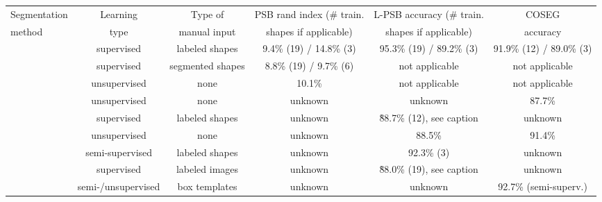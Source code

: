\begin{table*}[t!]
\small
  \centering
    \begin{tabular*}{\textwidth}{l|c|c|c|c|c@{}}
    \hline
    Segmentation                & Learning           & Type of          & PSB rand index (\# train. & L-PSB  accuracy (\# train.  & COSEG          \\
    method                      & type               & manual input     & shapes if applicable)     & shapes if applicable)       & accuracy       \\
    \hline
    \hline
    \cite{Kalogerakis:2010:LMS} & supervised         & labeled shapes   & 9.4\% (19) / 14.8\% (3)   & 95.3\% (19) / 89.2\% (3)    & 91.9\% (12) / 89.0\% (3) \\
    \hline
    \cite{Benhabiles:2011:LBE}  & supervised         & segmented shapes & 8.8\% (19) / 9.7\% (6)    & not applicable              & not applicable \\
    \hline
    \cite{Huang:2011:JSS}       & unsupervised       & none             & 10.1\%                    & not applicable              & not applicable \\
    \hline
    \cite{Sidi:2011:CS}         & unsupervised       & none             & unknown                   & unknown                     & 87.7\%         \\
    \hline
    \cite{van-Kaick:2011:PKC}   & supervised         & labeled shapes   & unknown                   & \~88.7\% (12), see caption   & unknown        \\
    \hline
    \cite{Hu:2012:CSS}          & unsupervised       & none             & unknown                   & 88.5\%                      & 91.4\%         \\
    \hline
    \cite{Lv:2012:SMS}          & semi-supervised    & labeled shapes   & unknown                   & 92.3\% (3)                  & unknown        \\
    \hline
    \cite{Wang:2013:PAS}        & supervised         & labeled images   & unknown                   & \~88.0\% (19), see caption   & unknown               \\
    \hline
    \cite{Kim:2013:lpt}         & semi-/unsupervised & box templates    & unknown                   & unknown                     & 92.7\% (semi-superv.) \\

\end{tabular*}
\end{table*}
